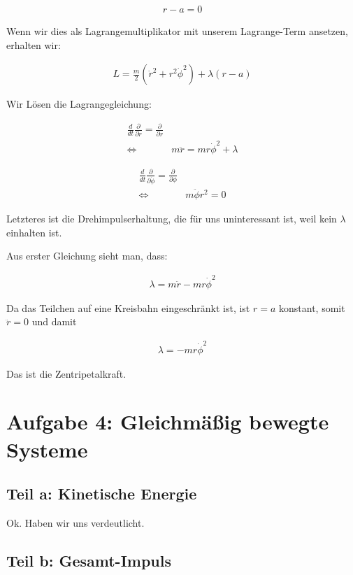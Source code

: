 \documentclass[a4paper,german,12pt,smallheadings]{scrartcl}
\begin{document}
\begin{align*}
  r - a = 0
\end{align*}

Wenn wir dies als Lagrangemultiplikator mit unserem Lagrange-Term ansetzen, erhalten wir:

\begin{align*}
  L = \frac{m}{2} (\dot{r}^2 + r^2\dot{\phi}^2)  + \lambda(r-a)
\end{align*}

Wir Lösen die Lagrangegleichung:

\begin{align*}
  \frac{d}{dt} \frac{\partial}{\partial \dot{r}} = \frac{\partial}{\partial r} \\
  \Leftrightarrow\quad& m\ddot{r} = mr\dot{\phi}^2 + \lambda
\end{align*}

\begin{align*}
  \frac{d}{dt} \frac{\partial}{\partial \dot{\phi}} = \frac{\partial}{\partial \phi} \\
  \Leftrightarrow\quad& m\ddot{\phi}r^2 = 0
\end{align*}

Letzteres ist die Drehimpulserhaltung, die für uns uninteressant ist, weil kein
$\lambda$ einhalten ist.

Aus erster Gleichung sieht man, dass:

\begin{align*}
  \lambda = m\ddot{r} - mr\dot{\phi}^2
\end{align*}

Da das Teilchen auf eine Kreisbahn eingeschränkt ist, ist $r=a$ konstant, somit $\ddot{r} = 0$ und damit

\begin{align*}
  \lambda = -mr\dot{\phi}^2
\end{align*}

Das ist die Zentripetalkraft.

\section{Aufgabe 4: Gleichmäßig bewegte Systeme}
\subsection*{Teil a: Kinetische Energie}

Ok. Haben wir uns verdeutlicht.

\subsection*{Teil b: Gesamt-Impuls}
\end{document}
